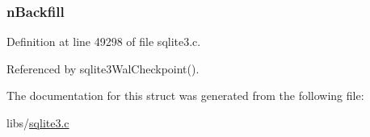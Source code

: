 \subsubsection[{n\+Backfill}]{ n\+Backfill}\label{struct_wal_ckpt_info_ab6a7ab4000490f2f9c6cb1c1ba893a47}


Definition at line 49298 of file sqlite3.\+c.



Referenced by sqlite3\+Wal\+Checkpoint().



The documentation for this struct was generated from the following file\+:\begin{DoxyCompactItemize}
\item 
libs/\hyperlink{sqlite3_8c}{sqlite3.\+c}\end{DoxyCompactItemize}
